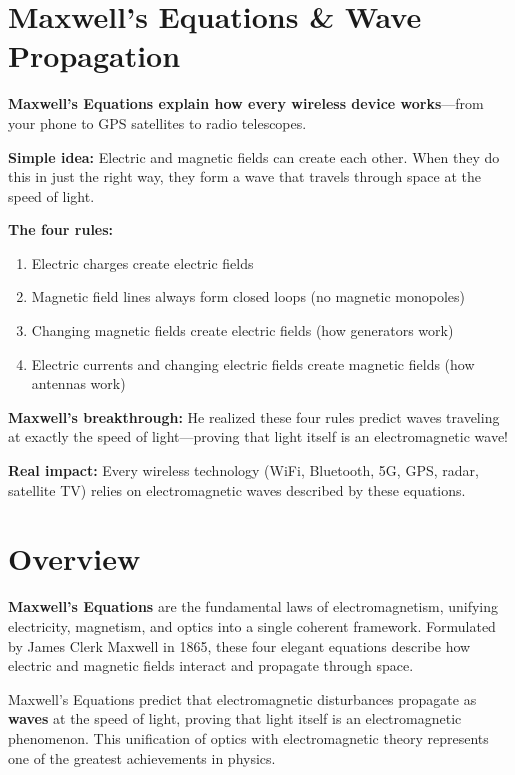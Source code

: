 \section{Maxwell's Equations \& Wave Propagation}
\label{sec:maxwell}

\begin{nontechnical}
\textbf{Maxwell's Equations explain how every wireless device works}---from your phone to GPS satellites to radio telescopes.

\textbf{Simple idea:} Electric and magnetic fields can create each other. When they do this in just the right way, they form a wave that travels through space at the speed of light.

\textbf{The four rules:}
\begin{enumerate}
\item Electric charges create electric fields
\item Magnetic field lines always form closed loops (no magnetic monopoles)
\item Changing magnetic fields create electric fields (how generators work)
\item Electric currents and changing electric fields create magnetic fields (how antennas work)
\end{enumerate}

\textbf{Maxwell's breakthrough:} He realized these four rules predict waves traveling at exactly the speed of light---proving that light itself is an electromagnetic wave!

\textbf{Real impact:} Every wireless technology (WiFi, Bluetooth, 5G, GPS, radar, satellite TV) relies on electromagnetic waves described by these equations.
\end{nontechnical}

\section{Overview}

\textbf{Maxwell's Equations} are the fundamental laws of electromagnetism, unifying electricity, magnetism, and optics into a single coherent framework. Formulated by James Clerk Maxwell in 1865, these four elegant equations describe how electric and magnetic fields interact and propagate through space.

\begin{keyconcept}
Maxwell's Equations predict that electromagnetic disturbances propagate as \textbf{waves} at the speed of light, proving that light itself is an electromagnetic phenomenon. This unification of optics with electromagnetic theory represents one of the greatest achievements in physics.
\end{keyconcept}

